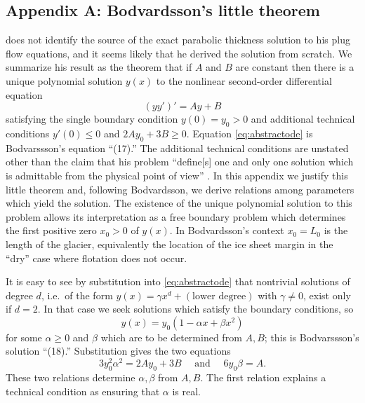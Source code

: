 \documentclass[twocolumn,letterpaper]{igs}
\begin{document}
\subsection{Appendix A: Bodvardsson's little theorem}  \cite{Bodvardsson} does not identify the source of the exact parabolic thickness solution to his plug flow equations, and it seems likely that he derived the solution from scratch.  We summarize his result as the theorem that if $A$ and $B$ are constant then there is a unique polynomial solution $y(x)$ to the nonlinear second-order differential equation
\begin{equation}
  (y y')' = Ay+B  \label{eq:abstractode}
\end{equation}
satisfying the single boundary condition $y(0) = y_0 > 0$ and additional technical conditions $y'(0) \le 0$ and $2A y_0 + 3 B \ge 0$.  Equation \eqref{eq:abstractode} is Bodvarssson's equation ``(17).''  The additional technical conditions are unstated other than the claim that his problem ``define[s] one and only one solution which is admittable from the physical point of view'' \citep{Bodvardsson}.  In this appendix we justify this little theorem and, following Bodvardsson, we derive relations among parameters which yield the solution.  The existence of the unique polynomial solution to this problem allows its interpretation as a free boundary problem which determines the first positive zero $x_0>0$ of $y(x)$.  In Bodvardsson's context $x_0=L_0$ is the length of the glacier, equivalently the location of the ice sheet margin in the ``dry'' case where flotation does not occur.

It is easy to see by substitution into \eqref{eq:abstractode} that nontrivial solutions of degree $d$, i.e.~of the form $y(x) = \gamma x^d + (\text{lower degree})$ with $\gamma\ne 0$, exist only if $d=2$.  In that case we seek solutions which satisfy the boundary conditions, so
\begin{equation}
y(x) = y_0(1 - \alpha x + \beta x^2)  \label{eq:abstractsoln}
\end{equation}
for some $\alpha\ge 0$ and $\beta$ which are to be determined from $A,B$; this is Bodvarssson's solution ``(18).''  Substitution gives the two equations
\begin{equation}
3 y_0^2 \alpha^2 = 2 A y_0 + 3 B \quad \text{ and } \quad 6 y_0 \beta = A.  \label{eq:abstractrelations}
\end{equation}
These two relations determine $\alpha,\beta$ from $A,B$.  The first relation explains a technical condition as ensuring that $\alpha$ is real.
\end{document}
